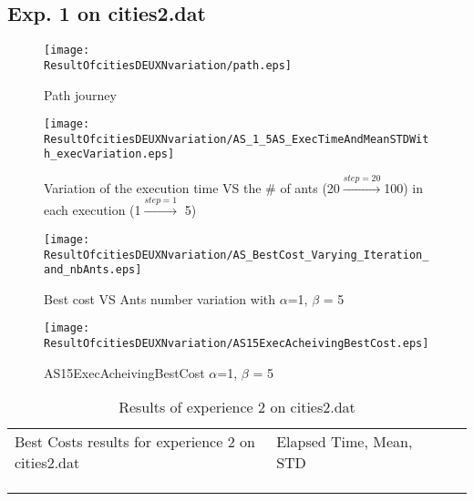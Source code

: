 \subsection*{ \centering Exp. 1 on cities2.dat }
	\vspace{-6mm}
\begin{figure}[H]
	\begin{minipage}[t]{0.5\linewidth}
		\texttt{[image: \\ResultOfcitiesDEUXNvariation/path.eps]}
		\caption{Path journey}
		\label{fig:ResultOfcitiesDEUXNvariation:path}
	\end{minipage}
	\hspace{2mm}
	\begin{minipage}[t]{0.5\linewidth}
	\texttt{[image: \\ResultOfcitiesDEUXNvariation/AS\_1\_5AS\_ExecTimeAndMeanSTDWith\_execVariation.eps]}
	\caption{Variation of the execution time VS the \# of ants (20$\stackrel{step=20}{\rightarrow}$100) in each execution (1$\stackrel{step=1}{\rightarrow}$ 5)}
	\label{fig:ResultOfcitiesDEUXNvariation:AS_1_5AS_ExecTimeAndMeanSTDWith_execVariation}
	\end{minipage}
\end{figure}
\begin{figure}[H]
	\begin{minipage}[t]{.5\linewidth}
	\centering
	\texttt{[image: \\ResultOfcitiesDEUXNvariation/AS\_BestCost\_Varying\_Iteration\_and\_nbAnts.eps]}
	\caption{Best cost VS Ants number variation with $\alpha$=1, $ \beta $ = 5}
	\label{fig:ResultOfcitiesDEUXNvariation:AS_BestCost_Varying_Iteration_and_nbAnts}
	\end{minipage}
	\begin{minipage}[t]{.5\linewidth}
	\texttt{[image: \\ResultOfcitiesDEUXNvariation/AS15ExecAcheivingBestCost.eps]}
	\caption{AS15ExecAcheivingBestCost $\alpha$=1, $ \beta $ = 5}
	\label{fig:ResultOfcitiesDEUXNvariation:AS15ExecAcheivingBestCost}
	\end{minipage}
\end{figure}
\begin{minipage}[t]{0.9\linewidth}
\vspace{-9mm}
\begin{table}[H]
\label{tab:ResultOfcitiesDEUXNvariation:expdeux}
\begin{tabular}{lllll}
\cline{1-2}
\multicolumn{1}{|l|}{Best Costs results for experience 2 on cities2.dat }                                                           &  \multicolumn{1}{l|}{Elapsed Time, Mean, STD}                                             &  &  &  \\ \cline{1-2}
\multicolumn{1}{|l|}{} & \multicolumn{1}{l|}{ } &  &  &  \\ \cline{1-2}
&     &  &  &  \\
&     &  &  & 
\end{tabular}
\caption{Results of experience 2 on cities2.dat}
\end{table}
\end{minipage}
